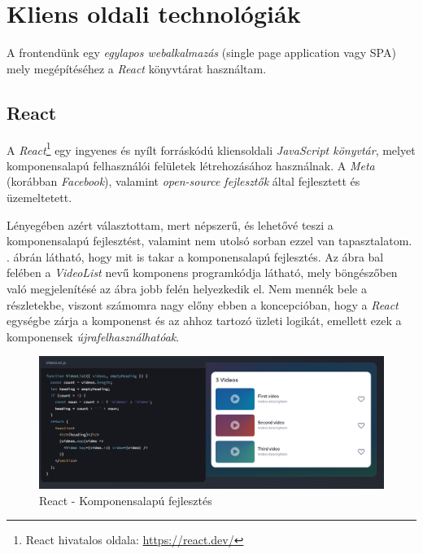 \documentclass[
]{thesis-ekf}
\theoremstyle{definition}
\theoremstyle{remark}
\begin{document}
\section{Kliens oldali technológiák}
A frontendünk egy \emph{egylapos webalkalmazás} (single page application vagy SPA) mely megépítéséhez a \emph{React} könyvtárat használtam.
\subsection{React}
A \emph{React}\footnote{React hivatalos oldala: \url{https://react.dev/}} egy ingyenes és nyílt forráskódú kliensoldali \emph{JavaScript könyvtár}, melyet komponensalapú felhasználói felületek létrehozásához használnak. A \emph{Meta} (korábban \emph{Facebook}), valamint \emph{open-source fejlesztők} által fejlesztett és üzemeltetett.\cite{wiki-react}

Lényegében azért választottam, mert népszerű, és lehetővé teszi a komponensalapú fejlesztést, valamint nem utolsó sorban ezzel van tapasztalatom. . ábrán látható, hogy mit is takar a komponensalapú fejlesztés. Az ábra bal felében a \emph{VideoList} nevű komponens programkódja látható, mely böngészőben való megjelenítésé az ábra jobb felén helyezkedik el. Nem mennék bele a részletekbe, viszont számomra nagy előny ebben a koncepcióban, hogy a \emph{React} egységbe zárja a komponenst és az ahhoz tartozó üzleti logikát, emellett ezek a komponensek \emph{újrafelhasználhatóak}.

\begin{figure}[H]
	\centering
	\includegraphics[width=14cm]{images/react-component-based.png}
	\caption[React - Komponensalapú fejlesztés]{React - Komponensalapú fejlesztés\footnotemark}
	\label{fig-react-component-based}
\end{figure}
\end{document}
